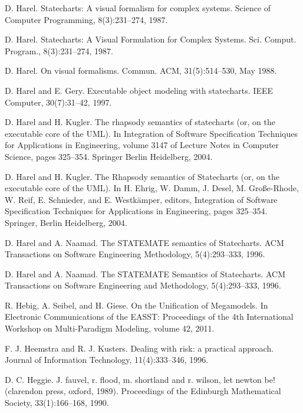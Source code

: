 \begin{description}[style=nextline,leftmargin=12mm,labelwidth=10mm,font=\normalfont]
\item[{[134]}] D. Harel. Statecharts: A visual formalism for complex systems. Science of Computer Programming, 8(3):231–274, 1987.

\item[{[135]}] D. Harel. Statecharts: A Visual Formulation for Complex Systems. Sci. Comput. Program., 8(3):231–274, 1987.

\item[{[136]}] D. Harel. On visual formalisms. Commun. ACM, 31(5):514–530, May 1988.

\item[{[137]}] D. Harel and E. Gery. Executable object modeling with statecharts. IEEE Computer, 30(7):31–42, 1997.

\item[{[138]}] D. Harel and H. Kugler. The rhapsody semantics of statecharts (or, on the executable core of the UML). In Integration of Software Specification Techniques for Applications in Engineering, volume 3147 of Lecture Notes in Computer Science, pages 325–354. Springer Berlin Heidelberg, 2004.

\item[{[139]}] D. Harel and H. Kugler. The Rhapsody semantics of Statecharts (or, on the executable core of the UML). In H. Ehrig, W. Damm, J. Desel, M. Große-Rhode, W. Reif, E. Schnieder, and E. Westkämper, editors, Integration of Software Specification Techniques for Applications in Engineering, pages 325–354. Springer, Berlin Heidelberg, 2004.

\item[{[140]}] D. Harel and A. Naamad. The STATEMATE semantics of Statecharts. ACM Transactions on Software Engineering Methodology, 5(4):293–333, 1996.

\item[{[141]}] D. Harel and A. Naamad. The STATEMATE Semantics of Statecharts. ACM Transactions on Software Engineering and Methodology, 5(4):293–333, 1996.

\item[{[142]}] R. Hebig, A. Seibel, and H. Giese. On the Unification of Megamodels. In Electronic Communications of the EASST: Proceedings of the 4th International Workshop on Multi-Paradigm Modeling, volume 42, 2011.

\item[{[143]}] F. J. Heemstra and R. J. Kusters. Dealing with risk: a practical approach. Journal of Information Technology, 11(4):333–346, 1996.

\item[{[144]}] D. C. Heggie. J. fauvel, r. flood, m. shortland and r. wilson, let newton be! (clarendon press, oxford, 1989). Proceedings of the Edinburgh Mathematical Society, 33(1):166–168, 1990.


\end{description}
